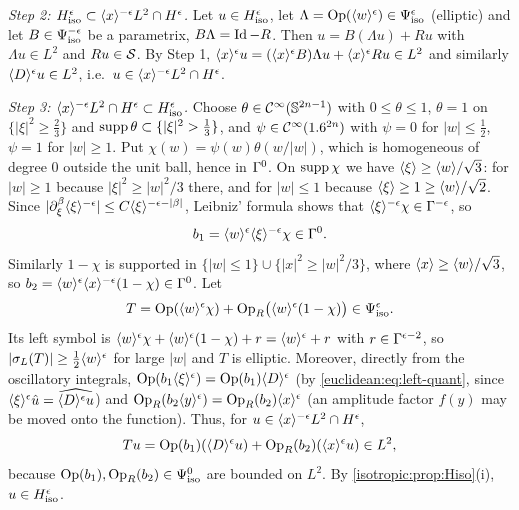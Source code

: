 \emph{Step 2: $H^{\epsilon}_{\mathrm{iso}}\subset\langle x\rangle^{-\epsilon}L^2\cap H^\epsilon$.} Let
$u\in H^{\epsilon}_{\mathrm{iso}}$, let $\Lambda=\operatorname{Op}(\langle w\rangle^\epsilon)\in\Psi^{\epsilon}_{\mathrm{iso}}$ (elliptic) and let
$B\in\Psi^{-\epsilon}_{\mathrm{iso}}$ be a parametrix, $B\Lambda=\operatorname{Id}-R$. Then $u=B(\Lambda u)+Ru$
with $\Lambda u\in L^2$ and $Ru\in\mathcal{S}$. By Step 1,
$\langle x\rangle^\epsilon u=(\langle x\rangle^\epsilon B)\Lambda u+\langle x\rangle^\epsilon Ru\in L^2$ and similarly
$\langle D\rangle^\epsilon u\in L^2$, i.e.\ $u\in\langle x\rangle^{-\epsilon}L^2\cap H^\epsilon$.

\emph{Step 3: $\langle x\rangle^{-\epsilon}L^2\cap H^\epsilon\subset H^{\epsilon}_{\mathrm{iso}}$.} Choose
$\theta\in\mathcal{C}^\infty(\mathbb{S}^{2n-1})$ with $0\le\theta\le1$, $\theta=1$ on
$\{|\xi|^2\ge\frac23\}$ and $\operatorname{supp}\theta\subset\{|\xi|^2>\frac13\}$, and
$\psi\in\mathcal{C}^\infty(1.6^{2n})$ with $\psi=0$ for $|w|\le\frac12$, $\psi=1$ for $|w|\ge1$.
Put $\chi(w)=\psi(w)\theta(w/|w|)$, which is homogeneous of degree $0$ outside the
unit ball, hence in $\Gamma^{0}$. On $\operatorname{supp}\chi$ we have $\langle \xi\rangle\ge\langle w\rangle/\sqrt3$:
for $|w|\ge1$ because $|\xi|^2\ge|w|^2/3$ there, and for $|w|\le1$ because
$\langle \xi\rangle\ge1\ge\langle w\rangle/\sqrt2$. Since $|\partial_\xi^\beta\langle \xi\rangle^{-\epsilon}|\le C\langle \xi\rangle^{-\epsilon-|\beta|}$,
Leibniz' formula shows that $\langle \xi\rangle^{-\epsilon}\chi\in\Gamma^{-\epsilon}$, so
\begin{equation*}
  b_1=\langle w\rangle^\epsilon\langle \xi\rangle^{-\epsilon}\chi\in\Gamma^{0}.
\end{equation*}
Similarly $1-\chi$ is supported in $\{|w|\le1\}\cup\{|x|^2\ge|w|^2/3\}$, where
$\langle x\rangle\ge\langle w\rangle/\sqrt3$, so $b_2=\langle w\rangle^\epsilon\langle x\rangle^{-\epsilon}(1-\chi)\in\Gamma^{0}$. Let
\begin{equation*}
  T=\operatorname{Op}(\langle w\rangle^\epsilon\chi)+\operatorname{Op}_R\bigl(\langle w\rangle^\epsilon(1-\chi)\bigr)\in\Psi^{\epsilon}_{\mathrm{iso}}.
\end{equation*}
Its left symbol is $\langle w\rangle^\epsilon\chi+\langle w\rangle^\epsilon(1-\chi)+r=\langle w\rangle^\epsilon+r$ with
$r\in\Gamma^{\epsilon-2}$, so $|\sigma_L(T)|\ge\frac12\langle w\rangle^\epsilon$ for large $|w|$ and
$T$ is elliptic. Moreover, directly from the oscillatory integrals,
$\operatorname{Op}(b_1\langle \xi\rangle^\epsilon)=\operatorname{Op}(b_1)\langle D\rangle^\epsilon$ (by \eqref{euclidean:eq:left-quant},
since $\langle \xi\rangle^\epsilon\hat u=\widehat{\langle D\rangle^\epsilon u}$) and
$\operatorname{Op}_R(b_2\langle y\rangle^\epsilon)=\operatorname{Op}_R(b_2)\langle x\rangle^\epsilon$ (an amplitude factor $f(y)$ may be
moved onto the function). Thus, for $u\in\langle x\rangle^{-\epsilon}L^2\cap H^\epsilon$,
\begin{equation*}
  Tu=\operatorname{Op}(b_1)(\langle D\rangle^\epsilon u)+\operatorname{Op}_R(b_2)(\langle x\rangle^\epsilon u)\in L^2,
\end{equation*}
because $\operatorname{Op}(b_1),\operatorname{Op}_R(b_2)\in\Psi^{0}_{\mathrm{iso}}$ are bounded on $L^2$. By
\cref{isotropic:prop:Hiso}(i), $u\in H^{\epsilon}_{\mathrm{iso}}$.

